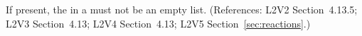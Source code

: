 If present, the  in a \KineticLaw must not
be an empty list.  (References: L2V2 Section~4.13.5; L2V3
Section~4.13; L2V4 Section~4.13; L2V5 Section~\ref{sec:reactions}.)
